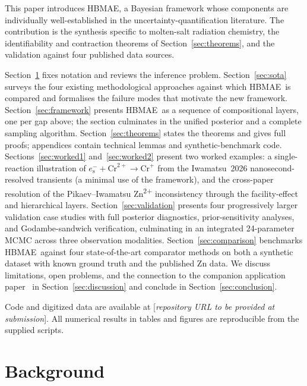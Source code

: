 \documentclass[12pt]{article}
\theoremstyle{plain}
\theoremstyle{definition}
\theoremstyle{remark}
\newcommand{\eS}{\ensuremath{e_{\mathrm{s}}^{-}}\xspace}
\newcommand{\HBMAE}{HBMAE\xspace}
\begin{document}
This paper introduces \HBMAE, a Bayesian framework whose components are
individually well-established in the uncertainty-quantification literature.
The contribution is the synthesis specific to molten-salt radiation chemistry,
the identifiability and contraction theorems of
Section~\ref{sec:theorems}, and the validation against four published data
sources.

Section~\ref{sec:background} fixes notation and reviews the
inference problem.  Section~\ref{sec:sota} surveys the four existing
methodological approaches against which \HBMAE\ is compared and
formalises the failure modes that motivate the new framework.
Section~\ref{sec:framework} presents \HBMAE\ as a sequence of compositional
layers, one per gap above; the section culminates in the unified posterior
and a complete sampling algorithm.  Section~\ref{sec:theorems} states the
theorems and gives full proofs; appendices contain technical lemmas
and synthetic-benchmark code.  Sections~\ref{sec:worked1}
and~\ref{sec:worked2} present two worked examples:
a single-reaction illustration of
$\eS+\mathrm{Cr}^{2+}\to\mathrm{Cr}^+$ from the Iwamatsu~2026
nanosecond-resolved transients (a minimal use of the framework), and the
cross-paper resolution of the
Pikaev--Iwamatsu \mbox{Zn}\textsuperscript{2+} inconsistency through the
facility-effect and hierarchical layers.  Section~\ref{sec:validation} presents four
progressively larger validation case studies with full posterior
diagnostics, prior-sensitivity analyses, and Godambe-sandwich
verification, culminating in an integrated 24-parameter MCMC across
three observation modalities.  Section~\ref{sec:comparison} benchmarks
\HBMAE\ against four state-of-the-art comparator methods on both a
synthetic dataset with known ground truth and the published Zn data.  We
discuss limitations, open problems, and the connection to the companion
application paper~\citep{Tanore2026PaperII} in
Section~\ref{sec:discussion} and conclude in
Section~\ref{sec:conclusion}.

Code and digitized data are available at
[\textit{repository URL to be provided at submission}].  All numerical results
in tables and figures are reproducible from the supplied scripts.

\bigskip

\section{Background}\label{sec:background}
\end{document}
